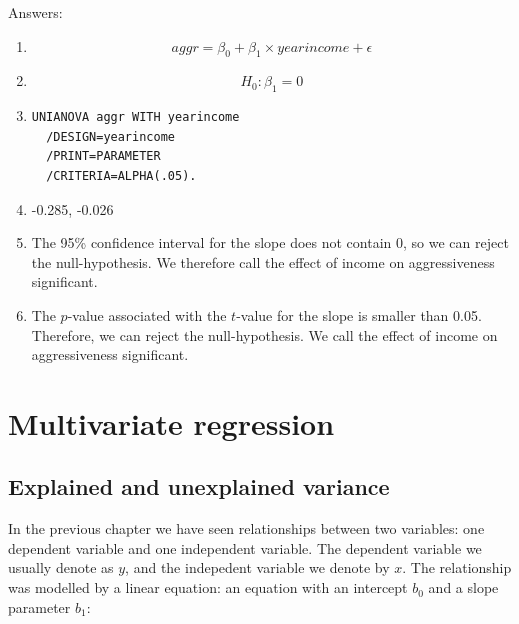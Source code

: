 \documentclass[]{report}\usepackage[]{graphicx}\usepackage[]{color}
\begin{document}
Answers:

\begin{enumerate}
\item

\begin{equation}
aggr = \beta_0 + \beta_1 \times yearincome + \epsilon
\end{equation}

\item
\begin{equation}
H_0 : \beta_1 = 0
\end{equation}


\item
\begin{verbatim}
UNIANOVA aggr WITH yearincome
  /DESIGN=yearincome
  /PRINT=PARAMETER
  /CRITERIA=ALPHA(.05).
\end{verbatim}




\item

 -0.285, -0.026



\item The 95\% confidence interval for the slope does not contain 0, so we can reject the null-hypothesis. We therefore call the effect of income on aggressiveness significant.

\item The $p$-value associated with the $t$-value for the slope is smaller than 0.05. Therefore, we can reject the null-hypothesis. We  call the effect of income on aggressiveness significant.


\end{enumerate}





\chapter{Multivariate regression}\label{chap:multivariate}


\section{Explained and unexplained variance}

In the previous chapter we have seen relationships between two variables: one dependent variable and one independent variable. The dependent variable we usually denote as $y$, and the indepedent variable we denote by $x$. The relationship was modelled by a linear equation: an equation with an intercept $b_0$ and a slope parameter $b_1$:
\end{document}
